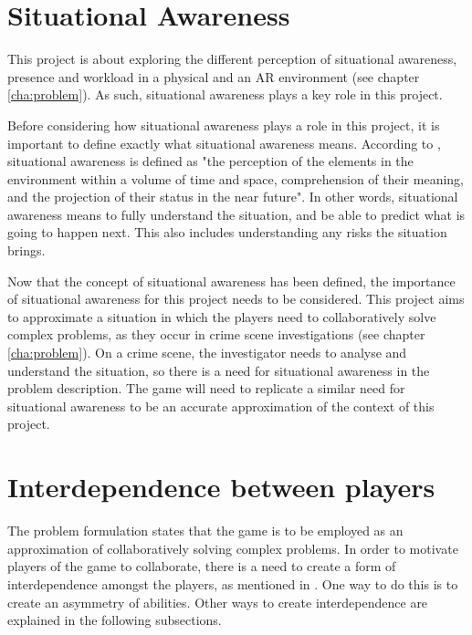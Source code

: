 
	\section{Situational Awareness} \label{sec:awareness}
		This project is about exploring the different perception of situational
		awareness, presence and workload in a physical and an AR environment
		(see chapter \ref{cha:problem}). As such, situational awareness plays a
		key role in this project.

		Before considering how situational awareness plays a role in this project,
		it is important to define exactly what situational awareness means.
		According to \cite{endsley}, situational awareness is defined as "the
		perception of the elements in the environment within a volume of time and
		space, comprehension of their meaning, and the projection of their status in
		the near future". In other words, situational awareness means to
		fully understand the situation, and be able to predict what is going to
		happen next. This also includes understanding any risks the situation brings.

		Now that the concept of situational awareness has been defined, the
		importance of situational awareness for this project needs to be considered.
		This project aims to approximate a situation in which the players need to
		collaboratively solve complex problems, as they occur in crime scene
		investigations (see chapter \ref{cha:problem}). On a crime scene, the
		investigator needs to analyse and understand the situation, so there is a
		need for situational awareness in the problem description. The game will need
		to replicate a similar need for situational awareness to be an accurate
		approximation of the context of this project.

	\section{Interdependence between players} \label{sec:interdependence}
		The problem formulation states that the game is to be employed as an
		approximation of collaboratively solving complex problems. In order to
		motivate players of the game to collaborate, there is a need to create
		a form of interdependence amongst the players, as mentioned in \cite{zagal}. One way to do this is to
		create an asymmetry of abilities. Other ways to create interdependence
		are explained in the following subsections.
